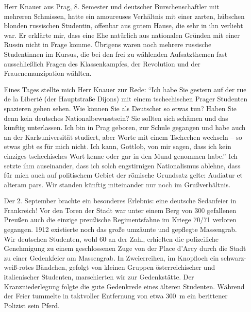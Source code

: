 \documentclass[a5paper,pagesize,10pt,twoside=true]{scrbook}
\begin{document}
Herr Knauer aus Prag, 8. Semester und deutscher Burschenschaftler mit mehreren Schmissen, hatte ein amoureuses Verhältnis mit einer zarten, hübschen blonden russischen Studentin, offenbar aus gutem Hause, die sehr in ihn verliebt war. Er erklärte mir, dass eine Ehe natürlich aus nationalen Gründen mit einer Russin nicht in Frage komme. Übrigens waren noch mehrere russische Studentinnen im Kursus, die bei den frei zu wählenden Aufsatzthemen fast ausschließlich Fragen des Klassenkampfes, der Revolution und der Frauenemanzipation wählten.

Eines Tages stellte mich Herr Knauer zur Rede: \enquote{Ich habe Sie gestern auf der rue de la Liberté (der Hauptstraße Dijons) mit einem tschechischen Prager Studenten spazieren gehen sehen. Wie können Sie als Deutscher so etwas tun? Haben Sie denn kein deutsches Nationalbewusstsein? Sie sollten sich schämen und das künftig unterlassen. Ich bin in Prag geboren, zur Schule gegangen und habe auch an der Karlsuniversität studiert, aber Worte mit einem Tschechen wechseln -- so etwas gibt es für mich nicht. Ich kann, Gottlob, von mir sagen, dass ich kein einziges tschechisches Wort kenne oder gar in den Mund genommen habe.} Ich setzte ihm auseinander, dass ich solch engstirnigen Nationalismus ablehne, dass für mich auch auf politischem Gebiet der römische Grundsatz gelte: Audiatur et alteram pars. Wir standen künftig miteinander nur noch im Grußverhältnis.

Der 2. September brachte ein besonderes Erlebnis: eine deutsche Sedanfeier in Frankreich! Vor den Toren der Stadt war unter einem Berg von 300 gefallenen Preußen auch die einzige preußische Regimentsfahne im Kriege 70/71 verloren gegangen. 1912 existierte noch das große umzäunte und gepflegte Massengrab. Wir deutschen Studenten, wohl 60 an der Zahl, erhielten die polizeiliche Genehmigung zu einem geschlossenen Zuge von der Place d'Arcy durch die Stadt zu einer Gedenkfeier am Massengrab. In Zweierreihen, im Knopfloch ein schwarz-weiß-rotes Bändchen, gefolgt von kleinen Gruppen österreichischer und italienischer Studenten, marschierten wir zur Gedenkstätte. Der Kranzniederlegung folgte die gute Gedenkrede eines älteren Studenten. Während der Feier tummelte in taktvoller Entfernung von etwa 300~m ein berittener Polizist sein Pferd.
\end{document}
